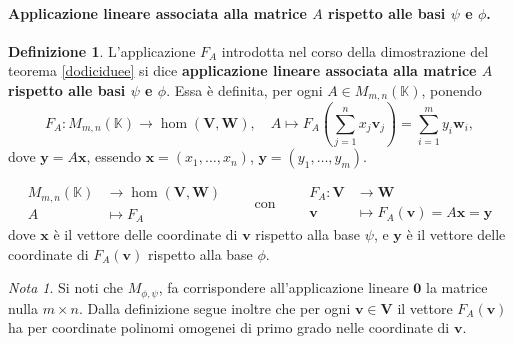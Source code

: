 \documentclass{article}
\theoremstyle{plain}
\theoremstyle{definition}
\newtheorem{defn}{Definizione}[section]
\theoremstyle{remark}
\newtheorem{note}{Nota}
\begin{document}
\vspace{10pt}

\paragraph{Applicazione lineare associata alla matrice \( A \) rispetto alle basi \( \psi \) e \( \phi \).}
\begin{bxthm}
\begin{defn}
L'applicazione \( F_A \) introdotta nel corso della dimostrazione del teorema \ref{dodiciduee} si dice 
\textbf{applicazione lineare associata alla matrice \( A \) rispetto alle basi \( \psi \) e \( \phi \)}. 
Essa è definita, per ogni \( A \in M_{m,n}(\mathbb{K}) \), ponendo
\[F_A:M_{m,n}(\mathbb{K}) \to \hom(\mathbf{V},\mathbf{W}),\quad A\mapsto F_A\left( \sum_{j=1}^{n}x_j \mathbf{v}_j\right) = \sum_{i=1}^{m}y_i\mathbf{w}_i,\]
dove \( \mathbf{y} = A\mathbf{x} \), essendo \( \mathbf{x} = (x_1, \dots, x_n) \), \( \mathbf{y} = (y_1, \dots, y_m) \).

\vspace{10pt}

\[
\begin{aligned}
M_{m,n}(\mathbb{K}) &\longrightarrow \hom(\mathbf{V}, \mathbf{W}) \\
A &\longmapsto F_A
\end{aligned}
\qquad\text{con}\qquad
\begin{aligned}
F_A : \mathbf{V} &\longrightarrow \mathbf{W} \\
\mathbf{v} &\longmapsto F_A(\mathbf{v}) = A\mathbf{x} = \mathbf{y}
\end{aligned}
\]
dove \( \mathbf{x} \) è il vettore delle coordinate di \( \mathbf{v} \) rispetto alla base \( \psi \), e \( \mathbf{y} \) è il vettore delle coordinate di \( F_A(\mathbf{v}) \) rispetto alla base \( \phi \).
\end{defn}
\end{bxthm}

\vspace{10pt}

\begin{note}
Si noti che \(M_{\phi,\psi}\), fa corrispondere all'applicazione lineare \(\mathbf{0}\) la matrice nulla \( m \times n \). 
Dalla definizione segue inoltre che per ogni \( \mathbf{v} \in \mathbf{V} \) il vettore \( F_A(\mathbf{v}) \) ha per coordinate polinomi omogenei di primo grado nelle coordinate di \( \mathbf{v} \).    
\end{note}
\end{document}
